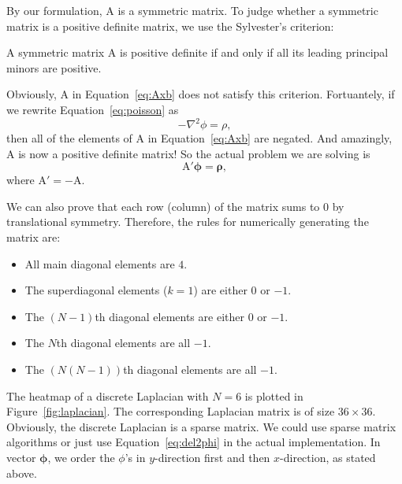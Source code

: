 By our formulation, \(\mathrm{ A }\) is a symmetric matrix.
To judge whether a symmetric matrix is a positive definite matrix, we use the
Sylvester's criterion:
%
\begin{theorem}[Sylvester]
    A symmetric matrix \(\mathrm{ A }\) is positive definite if and only if all its
    leading principal minors are positive.
\end{theorem}
%
Obviously, \(\mathrm{ A }\) in Equation~\eqref{eq:Axb} does not satisfy this criterion.
Fortuantely, if we rewrite Equation~\eqref{eq:poisson} as
%
\begin{equation}\label{eq:poissoncorrected}
    -\nabla^2 \phi = \rho,
\end{equation}
%
then all of the elements of \(\mathrm{ A }\) in Equation~\eqref{eq:Axb} are negated.
And amazingly, \(\mathrm{ A }\) is now a positive definite matrix!
So the actual problem we are solving is
%
\begin{equation}
    \mathrm{ A }' \bm{\phi} = \bm{\rho},
\end{equation}
%
where \(\mathrm{ A }' = -\mathrm{ A }\).

We can also prove that each row (column) of the matrix sums to \(0\) by
translational symmetry. Therefore, the rules for numerically generating
the matrix are\footnotemark{}:
%
\begin{itemize}
    \item All main diagonal elements are \(4\).
    \item The superdiagonal elements (\(k = 1\)) are either \(0\) or \(-1\).
    \item The \((N-1)\)th diagonal elements are either \(0\) or \(-1\).
    \item The \(N\)th diagonal elements are all \(-1\).
    \item The \((N(N - 1))\)th diagonal elements are all \(-1\).
\end{itemize}
%

The heatmap of a discrete Laplacian with \(N = 6\) is plotted in Figure~\ref{fig:laplacian}.
The corresponding Laplacian matrix is of size \(36 \times 36\).
Obviously, the discrete Laplacian is a sparse matrix.
We could use sparse matrix algorithms or just use Equation~\eqref{eq:del2phi} in the actual
implementation.
In vector \(\bm{\phi}\), we order the \(\phi\)'s in \(y\)-direction first and then
\(x\)-direction, as stated above.

